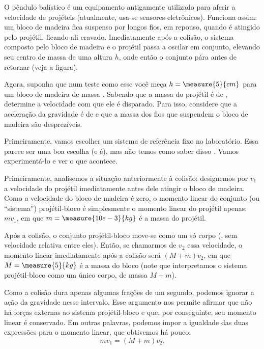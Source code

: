 \begin{question}
	O pêndulo balístico é um equipamento antigamente utilizado para aferir a velocidade de projéteis (atualmente, usa-se sensores eletrônicos).
	Funciona assim: um bloco de madeira fica suspenso por longos fios, em repouso, quando é atingido pelo projétil, ficando ali cravado.
	Imediatamente após a colisão, o sistema composto pelo bloco de madeira e o projétil passa a oscilar em conjunto, elevando seu centro de massa de uma altura $h$, onde então o conjunto pára antes de retornar (veja a figura).


	Agora, suponha que num teste como esse você meça $h = \measure{5}{cm}$ para um bloco de madeira de massa .
	Sabendo que a massa do projétil é de , determine a velocidade com que ele é disparado.
	Para isso, considere que a aceleração da gravidade é de  e que a massa dos fios que suspendem o bloco de madeira são desprezíveis.

	\begin{answer}
	\end{answer}

	\begin{solution}
		Primeiramente, vamos escolher um sistema de referência fixo no laboratório.
		Essa parece ser uma boa escolha (e é), mas não temos como saber disso .
		Vamos experimentá-lo e ver o que acontece.

		Primeiramente, analisemos a situação anteriormente à colisão: designemos por $v_1$ a velocidade do projétil imediatamente antes dele atingir o bloco de madeira.
		Como a velocidade do bloco de madeira é zero, o momento linear do conjunto (ou ``sistema'') projétil-bloco é simplesmente o momento linear do projétil apenas: $mv_1$, em que $m = \measure{10e-3}{kg}$ é a massa do projétil.

		Após a colisão, o conjunto projétil-bloco move-se como um só corpo (\ie, sem velocidade relativa entre eles).
		Então, se chamarmos de $v_2$ essa velocidade, o momento linear imediatamente após a colisão será $(M + m)v_2$, em que $M = \measure{5}{kg}$ é a massa do bloco (note que interpretamos o sistema projétil-bloco como um único corpo, de massa $M + m$).

		Como a colisão dura apenas algumas frações de um segundo, podemos ignorar a ação da gravidade nesse intervalo.
		Esse argumento nos permite afirmar que não há forças externas ao sistema projétil-bloco e que, por conseguinte, seu momento linear é conservado.
		Em outras palavras, podemos impor a igualdade das duas expressões para o momento linear, que obtivemos há pouco:
		\begin{equation}\label{eq:momentum}
			mv_1 = (M + m)v_2.
		\end{equation}


\end{solution}
\end{question}
